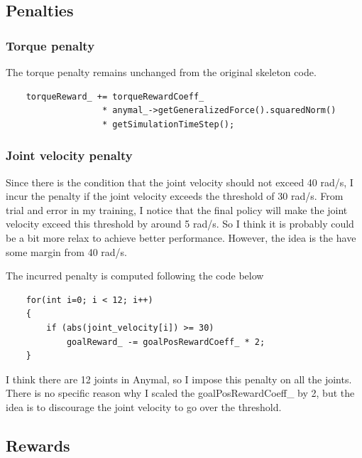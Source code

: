 \documentclass{article}
\begin{document}
    \subsection{Penalties}

    \subsubsection{Torque penalty}
        The torque penalty remains unchanged from the original skeleton code.

    \begin{verbatim}
    torqueReward_ += torqueRewardCoeff_ 
                   * anymal_->getGeneralizedForce().squaredNorm() 
                   * getSimulationTimeStep();
    \end{verbatim}

    \subsubsection{Joint velocity penalty}
        Since there is the condition that the joint velocity should not exceed 40 rad/s, 
    I incur the penalty if the joint velocity exceeds the threshold of 30 rad/s. From trial and error in my training, 
    I notice that the final policy will make the joint velocity exceed this threshold by
    around 5 rad/s. So I think it is probably could be a bit more relax to achieve better performance. 
    However, the idea is the have some margin from 40 rad/s. 
    
        The incurred penalty is computed following the code below    
    \begin{verbatim}
    for(int i=0; i < 12; i++)
    {
        if (abs(joint_velocity[i]) >= 30)
            goalReward_ -= goalPosRewardCoeff_ * 2;
    } 
    \end{verbatim}
    I think there are 12 joints in Anymal, so I impose this penalty on all the joints. There is no specific reason why I scaled the 
    goalPosRewardCoeff\_ by 2, but the idea is to discourage the joint velocity to go over the threshold.
    

    \subsection{Rewards}
\end{document}
